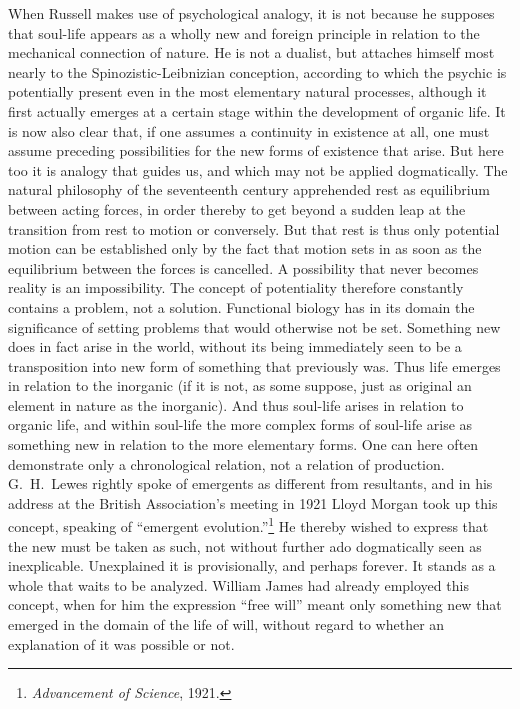 \documentclass[12pt]{book}
\newcommand{\opage}[1]{\marginnote{\footnotesize\textit{[#1]}}}
\begin{document}
When Russell makes use of psychological analogy, it is not because he supposes that soul-life appears
as a wholly new and foreign principle in relation to the mechanical connection of nature. He is not a
dualist, but attaches himself most nearly to the Spinozistic-Leibnizian conception, according to
which the psychic is potentially present even in the most elementary natural processes, although it
first actually emerges at a certain stage within the development of organic life. It is now also
clear that, if one assumes a continuity in existence at all, one must assume preceding possibilities
for the new forms of existence that arise. But here too it is analogy that guides us, and which may
not be applied dogmatically. The natural philosophy of the seventeenth century apprehended rest as
equilibrium between acting forces, in order thereby to get beyond a sudden leap at the transition from
rest to motion or conversely. But that rest is thus only potential motion can be established only by
the fact that motion sets in as soon as the equilibrium between the forces is cancelled. A
possibility that never becomes reality is an impossibility. The concept of potentiality therefore
constantly contains a problem, \opage{30}not a solution. Functional biology has in its domain the significance
of setting problems that would otherwise not be set. Something new does in fact arise in the world,
without its being immediately seen to be a transposition into new form of something that previously
was. Thus life emerges in relation to the inorganic (if it is not, as some suppose, just as original
an element in nature as the inorganic). And thus soul-life arises in relation to organic life, and
within soul-life the more complex forms of soul-life arise as something new in relation to the more
elementary forms. One can here often demonstrate only a chronological relation, not a relation of
production. G.\ H.\ Lewes rightly spoke of emergents as different from resultants, and in his address
at the British Association's meeting in 1921 Lloyd Morgan took up this concept, speaking of ``emergent
evolution.''\footnote{\textit{Advancement of Science}, 1921.} He thereby wished to express that the
new must be taken as such, not without further ado dogmatically seen as inexplicable. Unexplained it
is provisionally, and perhaps forever. It stands as a whole that waits to be analyzed. William James
had already employed this concept, when for him the expression ``free will'' meant only something new
that emerged in the domain of the life of will, without regard to whether an explanation of it was
possible or not.
\end{document}
